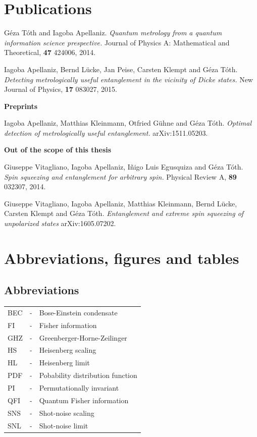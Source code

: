 \documentclass[12pt, letterpaper, twoside]{article}
\numberwithin{equation}{section}
\numberwithin{figure}{section}
\numberwithin{table}{section}
\newcommand{\abbrln}[2]{#1 & - & #2 \\}
\begin{document}
\section*{Publications}
{\setlength{\parindent}{0cm}
G\'eza T\'oth and Iagoba Apellaniz.
\textit{Quantum metrology from a quantum information science prespective.}
Journal of Physics A: Mathematical and Theoretical, \textbf{47} 424006, 2014.
\vspace{6pt}

Iagoba Apellaniz, Bernd L\"ucke, Jan Peise, Carsten Klempt and G\'eza T\'oth.
\textit{Detecting metrologically useful entanglement in the vicinity of Dicke states.}
New Journal of Physics, \textbf{17} 083027, 2015.
\vspace{6pt}

{\large\bf Preprints}

Iagoba Apellaniz, Matthias Kleinmann, Otfried G\"uhne and G\'eza T\'oth.
\textit{Optimal detection of metrologically useful entanglement.}
arXiv:1511.05203.
\vspace{6pt}

{\large\bf Out of the scope of this thesis}

Giuseppe Vitagliano, Iagoba Apellaniz, I\~nigo Luis Egusquiza and G\'eza T\'oth.
\textit{Spin squeezing and entanglement for arbitrary spin.}
Physical Review A, \textbf{89} 032307, 2014.
\vspace{6pt}

Giuseppe Vitagliano, Iagoba Apellaniz, Matthias Kleinmann, Bernd L\"ucke, Carsten Klempt and G\'eza T\'oth.
\textit{Entanglement and extreme spin squeezing of unpolarized states} arXiv:1605.07202.
}


\vspace*{100pt}
\tableofcontents

\section*{Abbreviations, figures and tables}
\fancyfoot[LE,RO]{\thepage}
\subsection*{Abbreviations}
\hspace{7pt}
\begin{tabular}{l c l}
  \abbrln{BEC}{Bose-Einstein condensate}
  \abbrln{FI}{Fisher information}
  \abbrln{GHZ}{Greenberger-Horne-Zeilinger}
  \abbrln{HS}{Heisenberg scaling}
  \abbrln{HL}{Heisenberg limit}
  \abbrln{PDF}{Pobability distribution function}
  \abbrln{PI}{Permutationally invariant}
  \abbrln{QFI}{Quantum Fisher information}
  \abbrln{SNS}{Shot-noise scaling}
  \abbrln{SNL}{Shot-noise limit}
\end{tabular}
\end{document}
